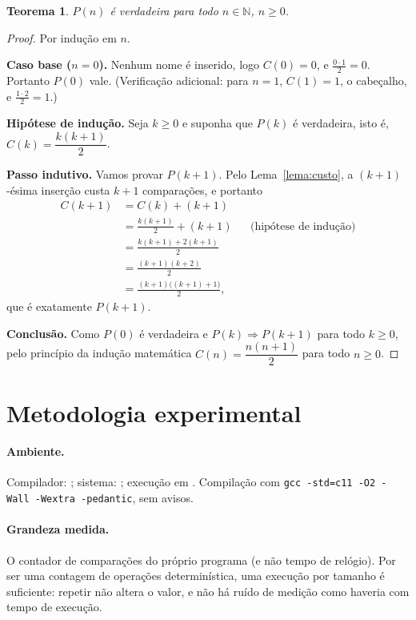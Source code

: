 \documentclass[11pt,a4paper]{article}
\newtheorem{teorema}{Teorema}
\begin{document}
\begin{teorema}
$P(n)$ é verdadeira para todo $n\in\mathbb{N}$, $n\ge 0$.
\end{teorema}
\begin{proof}
Por indução em $n$.

\textbf{Caso base ($n=0$).} Nenhum nome é inserido, logo $C(0)=0$, e
$\frac{0\cdot 1}{2}=0$. Portanto $P(0)$ vale. (Verificação adicional: para $n=1$,
$C(1)=1$, o cabeçalho, e $\frac{1\cdot 2}{2}=1$.)

\textbf{Hipótese de indução.} Seja $k\ge 0$ e suponha que $P(k)$ é verdadeira,
isto é, $C(k)=\dfrac{k(k+1)}{2}$.

\textbf{Passo indutivo.} Vamos provar $P(k+1)$. Pelo Lema~\ref{lema:custo}, a
$(k+1)$-ésima inserção custa $k+1$ comparações, e portanto
\begin{align*}
  C(k+1) &= C(k) + (k+1) \\
         &= \frac{k(k+1)}{2} + (k+1) && \text{(hipótese de indução)}\\
         &= \frac{k(k+1) + 2(k+1)}{2} \\
         &= \frac{(k+1)(k+2)}{2} \\
         &= \frac{(k+1)\big((k+1)+1\big)}{2},
\end{align*}
que é exatamente $P(k+1)$.

\textbf{Conclusão.} Como $P(0)$ é verdadeira e $P(k)\Rightarrow P(k+1)$ para todo
$k\ge 0$, pelo princípio da indução matemática $C(n)=\dfrac{n(n+1)}{2}$ para todo
$n\ge 0$.
\end{proof}

\section{Metodologia experimental}

\paragraph{Ambiente.} Compilador: \ambCompilador; sistema: \ambSistema; execução
em \ambData. Compilação com \texttt{gcc -std=c11 -O2 -Wall -Wextra -pedantic}, sem
avisos.

\paragraph{Grandeza medida.} O contador de comparações do próprio programa (e não
tempo de relógio). Por ser uma contagem de operações determinística, uma
execução por tamanho é suficiente: repetir não altera o valor, e não há ruído de
medição como haveria com tempo de execução.
\end{document}
